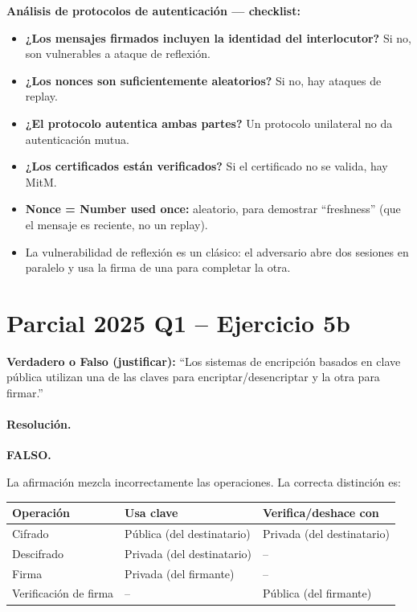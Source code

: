 \documentclass[11pt,a4paper]{article}
\begin{document}
\begin{tipsbox}
\textbf{Análisis de protocolos de autenticación --- checklist:}
\begin{itemize}
  \item \textbf{¿Los mensajes firmados incluyen la identidad del interlocutor?} Si no, son vulnerables a ataque de reflexión.
  \item \textbf{¿Los nonces son suficientemente aleatorios?} Si no, hay ataques de replay.
  \item \textbf{¿El protocolo autentica ambas partes?} Un protocolo unilateral no da autenticación mutua.
  \item \textbf{¿Los certificados están verificados?} Si el certificado no se valida, hay MitM.
  \item \textbf{Nonce = Number used once:} aleatorio, para demostrar ``freshness'' (que el mensaje es reciente, no un replay).
  \item La vulnerabilidad de reflexión es un clásico: el adversario abre dos sesiones en paralelo y usa la firma de una para completar la otra.
\end{itemize}
\end{tipsbox}

\section{Parcial 2025 Q1 -- Ejercicio 5b}
\label{sec:rsa2025Q1}

\begin{consignabox}
\textbf{Verdadero o Falso (justificar):} ``Los sistemas de encripción basados en clave pública utilizan una de las claves para encriptar/desencriptar y la otra para firmar.''
\end{consignabox}

\paragraph{Resolución.}

\textbf{FALSO.}

La afirmación mezcla incorrectamente las operaciones. La correcta distinción es:

\begin{center}
\renewcommand{\arraystretch}{1.4}
\begin{tabular}{lll}
\toprule
\textbf{Operación} & \textbf{Usa clave} & \textbf{Verifica/deshace con} \\
\midrule
Cifrado & Pública (del destinatario) & Privada (del destinatario) \\
Descifrado & Privada (del destinatario) & -- \\
Firma & Privada (del firmante) & -- \\
Verificación de firma & -- & Pública (del firmante) \\
\bottomrule
\end{tabular}
\end{center}
\end{document}
